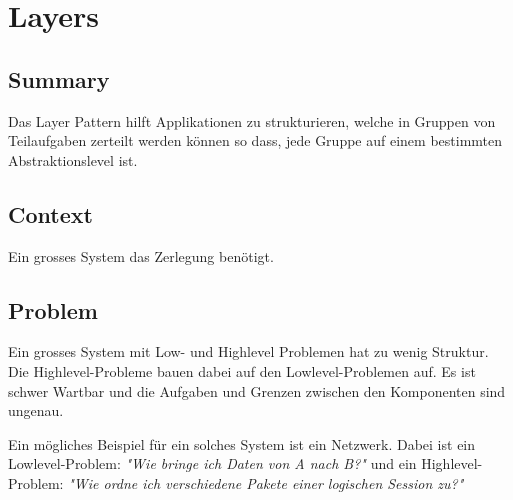 \chapter{Layers}

\section{Summary}
Das Layer Pattern hilft Applikationen zu strukturieren, welche in Gruppen von Teilaufgaben zerteilt werden können so dass, jede Gruppe auf einem bestimmten Abstraktionslevel ist.
\section{Context}
Ein grosses System das Zerlegung benötigt.

\section{Problem}
Ein grosses System mit Low- und Highlevel Problemen hat zu wenig Struktur. Die Highlevel-Probleme bauen dabei auf den Lowlevel-Problemen auf. Es ist schwer Wartbar und die Aufgaben und Grenzen zwischen den Komponenten sind ungenau.

Ein mögliches Beispiel für ein solches System ist ein Netzwerk. Dabei ist ein Lowlevel-Problem: \textit{"Wie bringe ich Daten von A nach B?"} und ein Highlevel-Problem: \textit{"Wie ordne ich verschiedene Pakete einer logischen Session zu?"}

